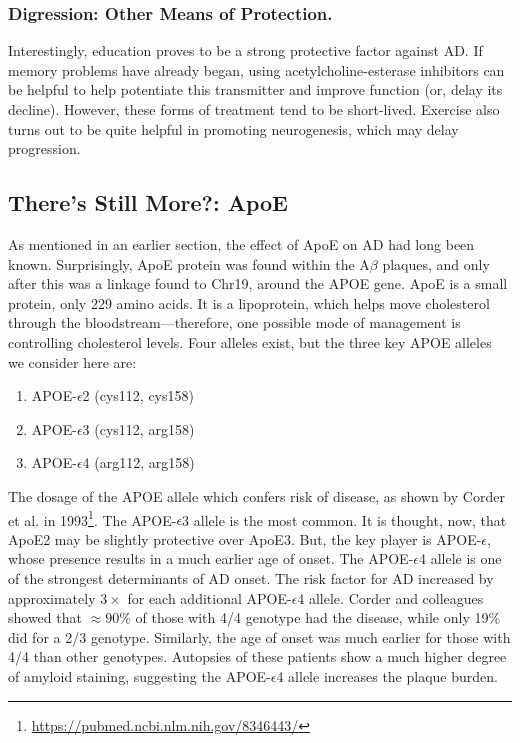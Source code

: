 \subsubsection*{Digression: Other Means of Protection.}

Interestingly, education proves to be a strong protective factor against AD. If memory problems have already began, using acetylcholine-esterase inhibitors can be helpful to help potentiate this transmitter and improve function (or, delay its decline). However, these forms of treatment tend to be short-lived. Exercise also turns out to be quite helpful in promoting neurogenesis, which may delay progression.


\subsection*{There's Still More?: ApoE}

As mentioned in an earlier section, the effect of ApoE on AD had long been known. Surprisingly, ApoE protein was found within the A$\beta$ plaques, and only after this was a linkage found to Chr19, around the APOE gene. ApoE is a small protein, only 229 amino acids. It is a lipoprotein, which helps move cholesterol through the bloodstream---therefore, one possible mode of management is controlling cholesterol levels. Four alleles exist, but the three key APOE alleles we consider here are: 

\begin{enumerate}
    \itemsep 0em
    \item APOE-$\epsilon$2 (cys112, cys158)
    \item APOE-$\epsilon$3 (cys112, arg158)
    \item APOE-$\epsilon$4 (arg112, arg158)
\end{enumerate}

The dosage of the APOE allele which confers risk of disease, as shown by Corder et al. in 1993\footnote{\url{https://pubmed.ncbi.nlm.nih.gov/8346443/}}. The APOE-$\epsilon$3 allele is the most common. It is thought, now, that ApoE2 may be slightly protective over ApoE3. But, the key player is  APOE-$\epsilon$, whose presence results in a much earlier age of onset. The APOE-$\epsilon$4 allele is one of the strongest determinants of AD onset. The risk factor for AD increased by approximately $3\times$ for each additional APOE-$\epsilon$4 allele. Corder and colleagues showed that $\approx 90\%$ of those with 4/4 genotype had the disease, while only 19\% did for a 2/3 genotype. Similarly, the age of onset was much earlier for those with 4/4 than other genotypes. Autopsies of these patients show a much higher degree of amyloid staining, suggesting the APOE-$\epsilon$4 allele increases the plaque burden.\newline 

